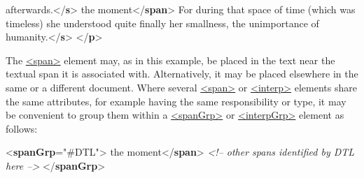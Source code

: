 \begin{shaded}
\hspace*{1em}\hspace*{1em} afterwards.{</\textbf{s}>}\mbox{}\newline 
{}the moment{</\textbf{span}>}\mbox{}\newline 
{}For during that space of time (which was\mbox{}\newline 
\hspace*{1em}\hspace*{1em} timeless) she understood quite finally her smallness, the\mbox{}\newline 
\hspace*{1em}\hspace*{1em} unimportance of humanity.{</\textbf{s}>}\mbox{}\newline 
{</\textbf{p}>}\end{shaded}\egroup\par \par
The \hyperref[TEI.span]{<span>} element may, as in this example, be placed in the text near the textual span it is associated with. Alternatively, it may be placed elsewhere in the same or a different document. Where several \hyperref[TEI.span]{<span>} or \hyperref[TEI.interp]{<interp>} elements share the same attributes, for example having the same responsibility or type, it may be convenient to group them within a \hyperref[TEI.spanGrp]{<spanGrp>} or \hyperref[TEI.interpGrp]{<interpGrp>} element as follows: \par\bgroup{}\exampleFont \begin{shaded}\noindent\mbox{}{<\textbf{spanGrp}\hspace*{1em}{resp}="{\#DTL}">}\mbox{}\newline 
{}the moment{</\textbf{span}>}\mbox{}\newline 
\textit{<!-- other spans identified by DTL here -->}\mbox{}\newline 
{</\textbf{spanGrp}>}\end{shaded}\egroup\par \par
